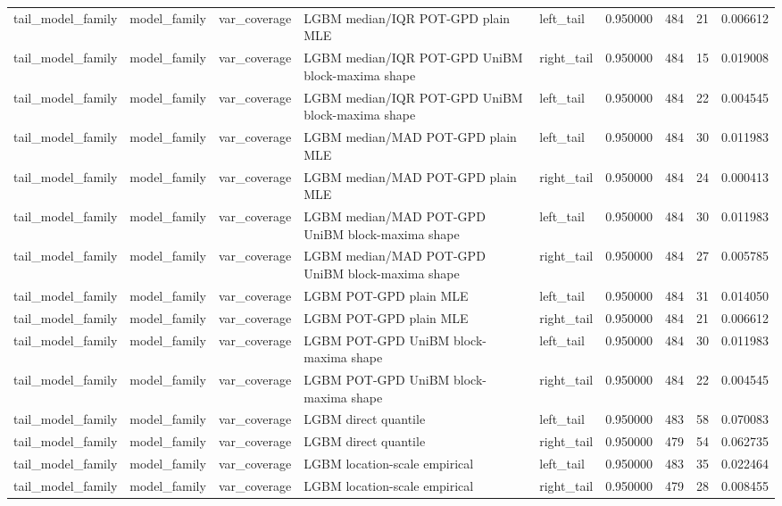 \begin{tabular}{lllllrrr}
tail\_model\_family & model\_family & var\_coverage & LGBM median/IQR POT-GPD plain MLE & left\_tail & 0.950000 & 484 & 21 & 0.006612 \\
tail\_model\_family & model\_family & var\_coverage & LGBM median/IQR POT-GPD UniBM block-maxima shape & right\_tail & 0.950000 & 484 & 15 & 0.019008 \\
tail\_model\_family & model\_family & var\_coverage & LGBM median/IQR POT-GPD UniBM block-maxima shape & left\_tail & 0.950000 & 484 & 22 & 0.004545 \\
tail\_model\_family & model\_family & var\_coverage & LGBM median/MAD POT-GPD plain MLE & left\_tail & 0.950000 & 484 & 30 & 0.011983 \\
tail\_model\_family & model\_family & var\_coverage & LGBM median/MAD POT-GPD plain MLE & right\_tail & 0.950000 & 484 & 24 & 0.000413 \\
tail\_model\_family & model\_family & var\_coverage & LGBM median/MAD POT-GPD UniBM block-maxima shape & left\_tail & 0.950000 & 484 & 30 & 0.011983 \\
tail\_model\_family & model\_family & var\_coverage & LGBM median/MAD POT-GPD UniBM block-maxima shape & right\_tail & 0.950000 & 484 & 27 & 0.005785 \\
tail\_model\_family & model\_family & var\_coverage & LGBM POT-GPD plain MLE & left\_tail & 0.950000 & 484 & 31 & 0.014050 \\
tail\_model\_family & model\_family & var\_coverage & LGBM POT-GPD plain MLE & right\_tail & 0.950000 & 484 & 21 & 0.006612 \\
tail\_model\_family & model\_family & var\_coverage & LGBM POT-GPD UniBM block-maxima shape & left\_tail & 0.950000 & 484 & 30 & 0.011983 \\
tail\_model\_family & model\_family & var\_coverage & LGBM POT-GPD UniBM block-maxima shape & right\_tail & 0.950000 & 484 & 22 & 0.004545 \\
tail\_model\_family & model\_family & var\_coverage & LGBM direct quantile & left\_tail & 0.950000 & 483 & 58 & 0.070083 \\
tail\_model\_family & model\_family & var\_coverage & LGBM direct quantile & right\_tail & 0.950000 & 479 & 54 & 0.062735 \\
tail\_model\_family & model\_family & var\_coverage & LGBM location-scale empirical & left\_tail & 0.950000 & 483 & 35 & 0.022464 \\
tail\_model\_family & model\_family & var\_coverage & LGBM location-scale empirical & right\_tail & 0.950000 & 479 & 28 & 0.008455 \\

\end{tabular}
